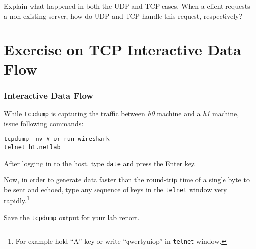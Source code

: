 \documentclass{../UTNetLab}
\begin{document}
    \begin{report}
        \item Explain what happened in both the UDP and TCP cases.
                When a client requests a non-existing server, how do UDP and TCP handle this request, respectively?
    \end{report}

\part{Exercise on TCP Interactive Data Flow}
\section{Interactive Data Flow}
While \lstinline{tcpdump} is capturing the traffic between \textit{h0} machine and a \textit{h1} machine, issue following commands:
    \begin{lstlisting}[emph={h1,netlab}]
tcpdump -nv # or run wireshark
telnet h1.netlab
    \end{lstlisting}
    After logging in to the host, type \lstinline{date} and press the {Enter} key.

    Now, in order to generate data faster than the round-trip time of a single byte to be sent and echoed, type any sequence of keys in the \lstinline{telnet} window very rapidly.\footnote{For example hold ``A'' key or write ``qwertyuiop'' in \lstinline{telnet} window.}

    {Save} the \lstinline{tcpdump} output for your lab report.
    
\end{document}
